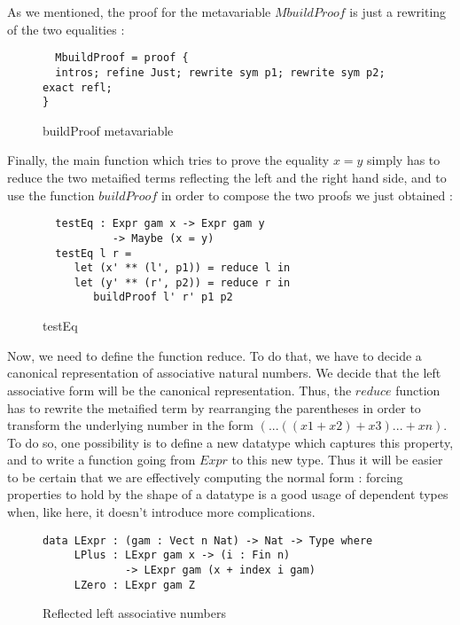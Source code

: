 As we mentioned, the proof for the metavariable $MbuildProof$ is just a rewriting of the two equalities :

\begin{figure}[H]
\figrule
\begin{center}
\begin{verbatim}
  MbuildProof = proof {
  intros; refine Just; rewrite sym p1; rewrite sym p2; exact refl;
}  
\end{verbatim}
\end{center}
\caption{buildProof metavariable}
\figrule
\end{figure}

Finally, the main function which tries to prove the equality $x=y$ simply has to reduce the two metaified terms reflecting the left and the right hand side, and to use the function $buildProof$ in order to compose the two proofs we just obtained :

\begin{figure}[H]
\figrule
\begin{center}
\begin{verbatim}
  testEq : Expr gam x -> Expr gam y 
           -> Maybe (x = y)
  testEq l r = 
     let (x' ** (l', p1)) = reduce l in 
     let (y' ** (r', p2)) = reduce r in
        buildProof l' r' p1 p2 
\end{verbatim}
\end{center}
\caption{testEq}
\figrule
\end{figure}

Now, we need to define the function reduce. To do that, we have to decide a canonical representation of associative natural numbers. We decide that the left associative form will be the canonical representation. Thus, the $reduce$ function has to rewrite the metaified term by rearranging the parentheses in order to transform the underlying number in the form $(...((x1 + x2) + x3) ... + xn)$. To do so, one possibility is to define a new datatype which captures this property, and to write a function going from $Expr$ to this new type. Thus it will be easier to be certain that we are effectively computing the normal form : forcing properties to hold by the shape of a datatype is a good usage of dependent types when, like here, it doesn't introduce more complications.

\begin{figure}[H]
\figrule
\begin{center}
\begin{verbatim}
data LExpr : (gam : Vect n Nat) -> Nat -> Type where
     LPlus : LExpr gam x -> (i : Fin n) 
             -> LExpr gam (x + index i gam)
     LZero : LExpr gam Z
\end{verbatim}
\end{center}
\caption{Reflected left associative numbers}
\figrule
\end{figure}

